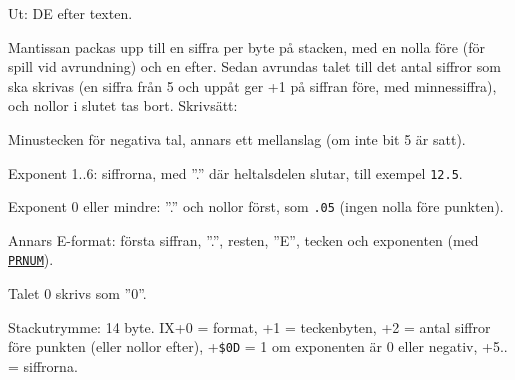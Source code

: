 \begin{Listing}
\begin{Note}
\begin{Verb}
\end{Verb}
\par\noindent Ut:  DE efter texten.\par
\par\noindent Mantissan packas upp till en siffra per byte på stacken, med en nolla före (för spill vid avrundning) och en efter. Sedan avrundas talet till det antal siffror som ska skrivas (en siffra från 5 och uppåt ger +1 på siffran före, med minnessiffra), och nollor i slutet tas bort. Skrivsätt:\par
\begin{Punkter}
\item Minustecken för negativa tal, annars ett mellanslag (om inte bit 5 är satt).
\item Exponent 1..6: siffrorna, med ”.” där heltalsdelen slutar, till exempel \texttt{12.5}.
\item Exponent 0 eller mindre: ”.” och nollor först, som \texttt{.05} (ingen nolla före punkten).
\item Annars E-format: första siffran, ”.”, resten, ”E”, tecken och exponenten (med \hyperlink{l:PRNUM}{\texttt{PRNUM}}).
\item Talet 0 skrivs som ”0”.
\end{Punkter}
\par\noindent Stackutrymme: 14 byte. IX+0 = format, +1 = teckenbyten, +2 = antal siffror före punkten (eller nollor efter), +\texttt{\$0D} = 1 om exponenten är 0 eller negativ, +5.. = siffrorna.\par

\end{Note}
\end{Listing}
